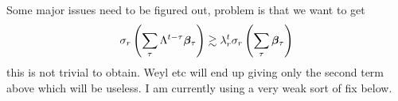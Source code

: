 \documentclass[10pt]{article}
\newcommand{\nsrmax}{\text{NSR}}
\newcommand{\SE}{\mathrm{SE}}
\begin{document}
%
%
%

%

{ \color{red} Some major issues need to be figured out, problem is that we want to get
\begin{align*}
\sigma_r\left( \sum_\tau \Lambda^{t-\tau} \bm{\beta}_\tau\right) \gtrsim \lambda_r^t \sigma_r\left( \sum_\tau \bm{\beta}_\tau\right)
\end{align*}
this is not trivial to obtain. Weyl etc will end up giving only the second term above which will be useless. I am currently using a very weak sort of fix below. 
}
\end{document}
